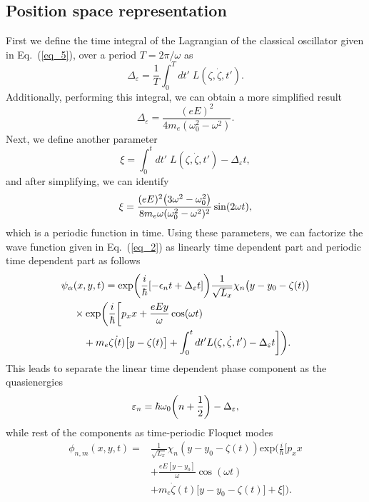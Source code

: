 \subsection{Position space representation}

First we define the time integral of the Lagrangian of the classical oscillator given in Eq.~(\ref{eq_5}), over a period $T=2\pi/\omega$ as
\begin{equation} \label{eq_b1}
  \Delta_{\varepsilon} = \frac{1}{T} \int_0^T dt' \; L(\zeta,\dot{\zeta},t').
\end{equation}
Additionally, performing this integral, we can obtain a more simplified result
\begin{equation} \label{eq_b2}
  \Delta_{\varepsilon} = \frac{(eE)^2}{4m_e(\omega_0^2 - \omega^2)}.
\end{equation}
Next, we define another parameter
\begin{equation} \label{eq_b3}
  \xi =
  \int_0^t dt' \; L(\zeta,\dot{\zeta},t') -
  \Delta_{\varepsilon} t,
\end{equation}
and after simplifying, we can identify
\begin{equation} \label{eq_b4}
  \xi =
  \frac{(eE)^2\qty(3\omega^2 - \omega_0^2)}{8m_e\omega(\omega_0^2 - \omega^2)^2} \sin(2\omega t),
\end{equation}
which is a periodic function in time. Using these parameters, we can factorize the wave function given in Eq.~(\ref{eq_2}) as linearly time dependent part and periodic time dependent part as follows
\begin{equation} \label{eq_b5}
  \begin{aligned}
    \psi_{\alpha}&(x,y,t)  =
    \exp(\frac{i}{\hbar}\qty[-\epsilon_nt + \Delta_{\varepsilon} t ])
    \frac{1}{\sqrt{L_x}} \chi_n\big(y - y_0 - \zeta(t)\big)
    \\
    & \times
    \text{exp}\bigg(
     \frac{i}{\hbar}\bigg[
     p_x x +
     \frac{eEy}{\omega}\cos(\omega t) \\
     & \quad+
     m_e\dot{\zeta(t)}\big[y-\zeta(t)\big]
     + \int_0^{t}dt'L(\zeta,\dot{\zeta},t') - \Delta_{\varepsilon} t  \bigg]
     \bigg).
  \end{aligned}
\end{equation}
This leads to separate the linear time dependent phase component as the quasienergies
\begin{equation} \label{eq_b6}
  \varepsilon_{n} =
  \hbar \omega_0\qty(n + \frac{1}{2}) - \Delta_{\varepsilon},
\end{equation}
while rest of the components as time-periodic Floquet modes
\begin{equation} \label{eq_b7}
  \begin{aligned}
    \phi_{n,m}(x,y,t) =  &
    \frac{1}{\sqrt{L_x}} \chi_{n}\left(y - y_0 - \zeta(t)\right)
    \text{exp}\bigg(
     \frac{i}{\hbar}\bigg[
     p_x x \\
     & +
     \frac{eE[y - y_0]}{\omega}\cos(\omega t) \\
     & +
     m_e\dot{\zeta}(t)\big[y - y_0 -\zeta(t)\big]
     + \xi \bigg]\bigg).
  \end{aligned}
\end{equation}

